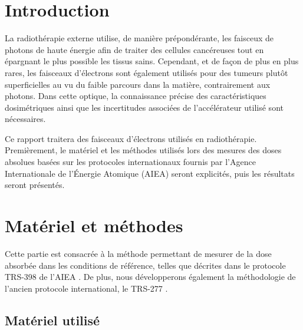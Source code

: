 \documentclass{article}
\begin{document}




\onehalfspacing

\pagestyle{fancy}
	\renewcommand\headrulewidth{0.5pt}
	\renewcommand\footrulewidth{0.5pt}
	\fancyfoot[R]{\thepage}

\tableofcontents
\clearpage
\section{Introduction}

La radiothérapie externe utilise, de manière prépondérante, les faisceux de photons de haute énergie afin de traiter des cellules cancéreuses tout en épargnant le plus possible les tissus sains. Cependant, et de façon de plus en plus rares, les faisceaux d'électrons sont également utilisés pour des tumeurs plutôt superficielles au vu du faible parcours dans la matière, contrairement aux photons. Dans cette optique, la connaissance précise des caractéristiques dosimétriques ainsi que les incertitudes associées de l'accélérateur utilisé sont nécessaires. 

Ce rapport traitera des faisceaux d'électrons utilisés en radiothérapie. Premièrement, le matériel et les méthodes utilisés lors des mesures des doses absolues basées sur les protocoles internationaux fournis par l'Agence Internationale de l'Énergie Atomique (AIEA) seront explicités, puis les résultats seront présentés. 

\section{Matériel et méthodes}

Cette partie est consacrée à la méthode permettant de mesurer de la dose absorbée dans les conditions de référence, telles que décrites dans le protocole TRS-398 de l'AIEA \cite{international2001iaea}. De plus, nous développerons également la méthodologie de l'ancien protocole international, le TRS-277 \cite{internationaliaea}.

\subsection{Matériel utilisé}
\end{document}
